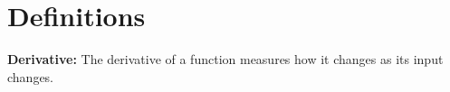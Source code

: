 \section{Definitions}
\textbf{Derivative:} The derivative of a function measures how it changes as its input changes.
